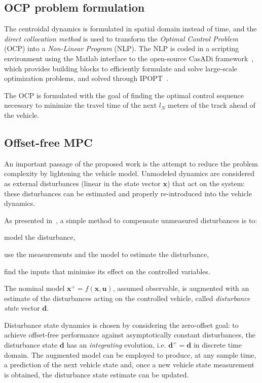 \documentclass[conference]{IEEEtran} %
\renewcommand{\vec}[1]{\boldsymbol{#1}}
\begin{document}
\subsection{OCP problem formulation}

The centroidal dynamics is formulated in spatial domain instead of time, and the \emph{direct collocation method} is used to transform the \emph{Optimal Control Problem} (OCP) into a \emph{Non-Linear Program} (NLP). The NLP is coded in a scripting environment using the Matlab interface to the open-source CasADi framework~\cite{Andersson2019}, which provides building
blocks to efficiently formulate and solve large-scale optimization problems, and solved through IPOPT~\cite{Wachter2006}.

The OCP is formulated with the goal of finding the optimal control sequence necessary to minimize the travel time of the next $l_N$ meters of the track ahead of the vehicle.

\subsection{Offset-free MPC}
\label{sec:offsetfree}

An important passage of the proposed work is the attempt to reduce the problem complexity by lightening the vehicle model.
Unmodeled dynamics are considered as external disturbances (linear in the state vector $\vec x$) that act on the system: these disturbances can be estimated and properly re-introduced into the vehicle dynamics.

As presented in~\cite{Pannocchia2015}, a simple method to compensate unmeasured disturbances is to:
\begin{enumerate*}[label=(\roman*)]
	\item model the disturbance,
	\item use the measurements and the model to estimate the disturbance,
	\item find the inputs that minimise its effect on the controlled variables.
\end{enumerate*}

The nominal model $\vec x^+=f(\vec x, \vec u)$, assumed observable, is augmented with an estimate of the disturbances acting on the controlled vehicle, called \emph{disturbance state} vector $\vec d$.

Disturbance state dynamics is chosen by considering the zero-offset goal: to achieve offset-free performance against asymptotically constant disturbances, the disturbance state $\vec d$ has an \emph{integrating} evolution, i.e. $\vec d^+ = \vec d$ in discrete time domain.
The augmented model can be employed to produce, at any sample time, a prediction of the next vehicle state and, once a new vehicle state measurement is obtained, the disturbance state estimate can be updated.
\end{document}
